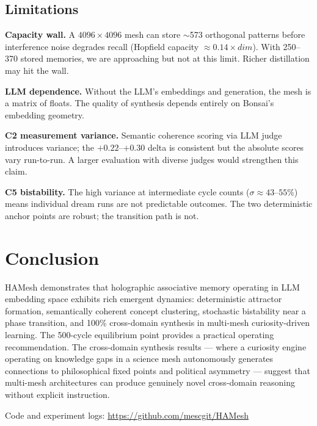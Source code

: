 \documentclass[11pt]{article}
\begin{document}
\subsection{Limitations}

\textbf{Capacity wall.} A $4096 \times 4096$ mesh can store $\sim$573
orthogonal patterns before interference noise degrades recall (Hopfield capacity
$\approx 0.14 \times \mathit{dim}$). With 250--370 stored memories, we are
approaching but not at this limit. Richer distillation may hit the wall.

\textbf{LLM dependence.} Without the LLM's embeddings and generation, the mesh
is a matrix of floats. The quality of synthesis depends entirely on Bonsai's
embedding geometry.

\textbf{C2 measurement variance.} Semantic coherence scoring via LLM judge
introduces variance; the $+0.22$--$+0.30$ delta is consistent but the absolute
scores vary run-to-run. A larger evaluation with diverse judges would strengthen
this claim.

\textbf{C5 bistability.} The high variance at intermediate cycle counts
($\sigma \approx 43$--$55\%$) means individual dream runs are not predictable
outcomes. The two deterministic anchor points are robust; the transition path is
not.

\section{Conclusion}

HAMesh demonstrates that holographic associative memory operating in LLM
embedding space exhibits rich emergent dynamics: deterministic attractor
formation, semantically coherent concept clustering, stochastic bistability
near a phase transition, and 100\% cross-domain synthesis in multi-mesh
curiosity-driven learning. The 500-cycle equilibrium point provides a practical
operating recommendation. The cross-domain synthesis results --- where a
curiosity engine operating on knowledge gaps in a science mesh autonomously
generates connections to philosophical fixed points and political asymmetry ---
suggest that multi-mesh architectures can produce genuinely novel cross-domain
reasoning without explicit instruction.

Code and experiment logs: \url{https://github.com/mescgit/HAMesh}
\end{document}
